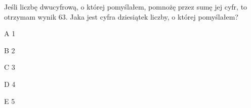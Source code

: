 \begin{tresc}
Jeśli liczbę dwucyfrową, o której pomyślałem, pomnożę przez sumę jej cyfr, to otrzymam wynik 63. Jaka jest cyfra dziesiątek liczby, o której pomyślałem?
\end{tresc}
\begin{wariant}{A} 1 \end{wariant}
\begin{wariant}{B} 2 \end{wariant}
\begin{wariant}{C} 3 \end{wariant}
\begin{wariant}{D} 4 \end{wariant}
\begin{wariant}{E} 5 \end{wariant}
